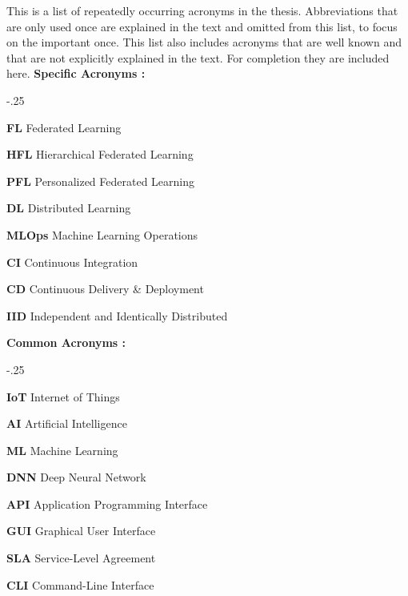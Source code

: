 This is a list of repeatedly occurring acronyms in the thesis.
Abbreviations that are only used once are explained in the text and omitted from this list,
to focus on the important once.
This list also includes acronyms that are well known and that are not explicitly explained in the text.
For completion they are included here.
\vspace{5mm}
\newline
\textbf{Specific Acronyms :}
\begin{acronym}
    \itemsep-.25\baselineskip
    \item[\textbf{FL}] Federated Learning 
    \item[\textbf{HFL}] Hierarchical Federated Learning 
    \item[\textbf{PFL}] Personalized Federated Learning 
    \item[\textbf{DL}] Distributed Learning
    \item[\textbf{MLOps}] Machine Learning Operations
    \item[\textbf{CI}] Continuous Integration
    \item[\textbf{CD}] Continuous Delivery \& Deployment
    \item[\textbf{IID}] Independent and Identically Distributed
\end{acronym}
\textbf{Common Acronyms :}
\begin{acronym}
    \itemsep-.25\baselineskip
    \item[\textbf{IoT}] Internet of Things
    \item[\textbf{AI}] Artificial Intelligence
    \item[\textbf{ML}] Machine Learning
    \item[\textbf{DNN}] Deep Neural Network
    \item[\textbf{API}] Application Programming Interface
    \item[\textbf{GUI}] Graphical User Interface
    \item[\textbf{SLA}] Service-Level Agreement
    \item[\textbf{CLI}] Command-Line Interface
\end{acronym}